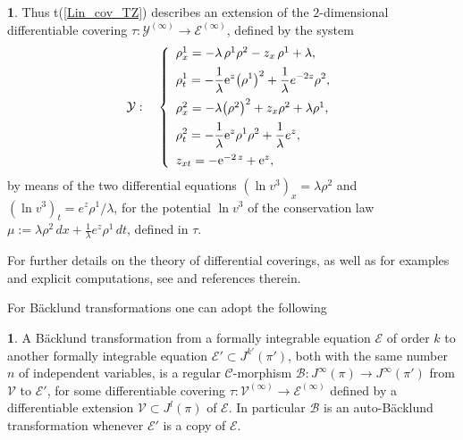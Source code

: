 \documentclass[12pt,english]{elsarticle}
\theoremstyle{plain}
\theoremstyle{plain}
\theoremstyle{remark}
\theoremstyle{plain}
\theoremstyle{definition}
\newtheorem{defn}[thm]{\protect\definitionname}
\theoremstyle{definition}
\newtheorem{example}[thm]{\protect\examplename}
\providecommand{\definitionname}{Definition}
\providecommand{\examplename}{Example}
\begin{document}
\begin{example}
%
Thus t{(\ref{Lin_cov_TZ})} describes an extension of the $2$-dimensional differentiable
covering
$\tau :\mathcal{Y}^{(\infty )}\longrightarrow \mathcal{E}^{(\infty )}$,
defined by the system
%
\begin{equation}
\mathcal{Y}:\quad \left \{
%
\begin{array}{l}
\rho _{x}^{1}=-\lambda \,\rho ^{1}\rho ^{2}-z_{x}\,\rho ^{1}+\lambda ,
\vspace{5pt}
\\
{\displaystyle \rho _{t}^{1}=-\frac{1}{\lambda}{{\mathrm{e}}^{z}}{\left (
\rho ^{1}\right )}^{2}+\frac{1}{\lambda}e^{-2z}\rho ^{2}},
\vspace{5pt}
\\
\rho _{x}^{2}=-\lambda{\left (\rho ^{2}\right )}^{2}+z_{x}{\rho ^{2}}+
\lambda \rho ^{1},
\vspace{5pt}
\\
{\displaystyle \rho _{t}^{2}=-\frac{1}{\lambda}{{\mathrm{e}}^{z}}{\rho ^{1}}{
\rho ^{2}}+\frac{1}{\lambda}e^{z}},
\vspace{5pt}
\\
z_{xt}=-{{\mathrm{e}}^{-2\,z}}+{{\mathrm{e}}^{z}},
\end{array}
%
\right .
\label{Riccati_TZ}
\end{equation}
%
by means of the two differential equations
$\left (\ln v^{3}\right )_{x}=\lambda{\rho ^{2}}$ and
$\left (\ln v^{3}\right )_{t}=e^{z}{\rho ^{1}/\lambda}$, for the
potential $\ln v^{3}$ of the conservation law
$\mu :=\lambda{\rho ^{2}}\,dx+\frac{1}{\lambda}e^{z}{\rho ^{1}}\,dt$, defined in $\tau $.
\end{example}

  For further details on the theory of differential coverings, as well
as for examples and explicit computations, see \cite{B_KrV} and references
therein.



For B\"{a}cklund transformations one can adopt the following
%
\begin{defn}
\label{def:BT-ABT}%
A B\"{a}cklund transformation from a formally integrable equation
$\mathcal{E}$ of order $k$ to another formally integrable equation
$\mathcal{E}'\subset J^{k'}(\pi ')$, both with the same number $n$ of independent
variables, is a regular $\mathcal{C}$-morphism
$\mathcal{B}:J^{\infty}(\pi )\rightarrow J^{\infty}(\pi ')$ from
$\mathcal{V}$ to $\mathcal{E}'$, for some differentiable covering
$\tau :\mathcal{V}^{(\infty )}\longrightarrow \mathcal{E}^{(\infty )}$
defined by a differentiable extension
$\mathcal{V}\subset J^{l}(\pi )$ of $\mathcal{E}$. In particular
$\mathcal{B}$ is an auto-B\"{a}cklund transformation whenever
$\mathcal{E}'$ is a copy of $\mathcal{E}$.
\end{defn}
\end{document}
